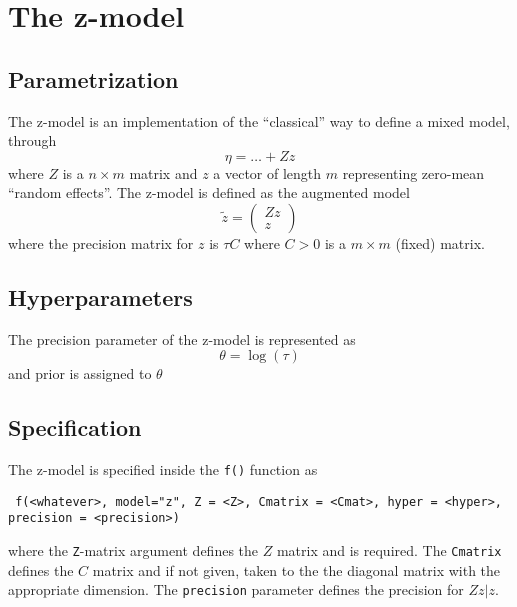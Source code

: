 \documentclass[a4paper,11pt]{article}
\begin{document}
\section*{The z-model}

\subsection*{Parametrization}

The z-model is an implementation of the ``classical'' way to define a
mixed model, through
\begin{displaymath}
    \eta = \ldots + Z z 
\end{displaymath}
where $Z$ is a $n\times m$ matrix and $z$ a vector of length $m$
representing zero-mean ``random effects''. The z-model is defined as
the augmented model
\begin{displaymath}
    \widetilde{z} =
    \begin{pmatrix}
        Zz \\
        z
    \end{pmatrix}
\end{displaymath}
where the precision matrix for $z$ is $\tau C$ where $C > 0$ is a
$m\times m$ (fixed) matrix.

\subsection*{Hyperparameters}

The precision parameter of the z-model is represented as
\begin{displaymath}
    \theta = \log(\tau)
\end{displaymath}
and prior is assigned to $\theta$

\subsection*{Specification}

The z-model is specified inside the {\tt f()} function as
\begin{verbatim}
 f(<whatever>, model="z", Z = <Z>, Cmatrix = <Cmat>, hyper = <hyper>,
precision = <precision>)
\end{verbatim}
where the \texttt{Z}-matrix argument defines the $Z$ matrix and is
required. The \texttt{Cmatrix} defines the $C$ matrix and if not
given, taken to the the diagonal matrix with the appropriate
dimension. The \texttt{precision} parameter defines the precision for
$Zz | z$.
\end{document}
